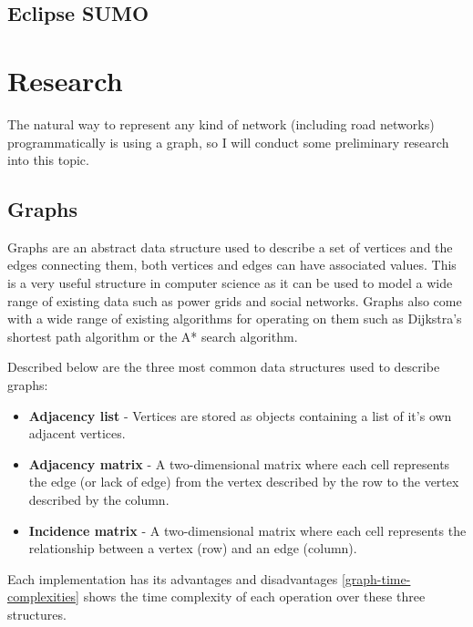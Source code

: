     \subsection{Eclipse SUMO}

\section{Research}

    The natural way to represent any kind of network (including road networks) programmatically is using a graph, so I will conduct some preliminary research into this topic.

    \subsection{Graphs}

        Graphs are an abstract data structure used to describe a set of vertices and the edges connecting them, both vertices and edges can have associated values. This is a very useful structure in computer science as it can be used to model a wide range of existing data such as power grids and social networks. Graphs also come with a wide range of existing algorithms for operating on them such as Dijkstra's shortest path algorithm or the A* search algorithm.

        Described below are the three most common data structures used to describe graphs:

        \begin{itemize}
            \item \textbf{Adjacency list} - Vertices are stored as objects containing a list of it's own adjacent vertices.
            \item \textbf{Adjacency matrix} - A two-dimensional matrix where each cell represents the edge (or lack of edge) from the vertex described by the row to the vertex described by the column.
            \item \textbf{Incidence matrix} - A two-dimensional matrix where each cell represents the relationship between a vertex (row) and an edge (column).
        \end{itemize}

        Each implementation has its advantages and disadvantages \autoref{graph-time-complexities} shows the time complexity of each operation over these three structures.


